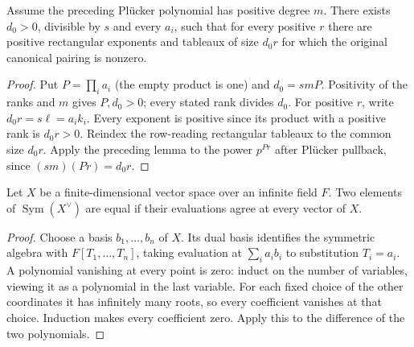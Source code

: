 \begin{lemma}
\label{lem:plucker-invariant-nonzero-sequence}
\leanok
Assume the preceding Pl\"ucker polynomial has positive degree $m$.
There exists $d_0>0$, divisible by $s$ and every $a_i$, such that for
every positive $r$ there are positive rectangular exponents and tableaux
of size $d_0r$ for which the original canonical pairing is nonzero.
\end{lemma}
\begin{proof}
Put $P=\prod_i a_i$ (the empty product is one) and $d_0=smP$.
Positivity of the ranks and $m$ gives $P,d_0>0$; every stated rank
divides $d_0$. For positive $r$, write $d_0r=s\ell=a_i k_i$.
Every exponent is positive since its product with a positive rank is
$d_0r>0$. Reindex the row-reading rectangular tableaux to the common
size $d_0r$. Apply the preceding lemma to the power $p^{Pr}$ after
Pl\"ucker pullback, since $(sm)(Pr)=d_0r$.
\end{proof}

\begin{lemma}
\label{lem:intrinsic-polynomial-ext}
\leanok
Let $X$ be a finite-dimensional vector space over an infinite field $F$.
Two elements of $\operatorname{Sym}(X^\vee)$ are equal if their evaluations
agree at every vector of $X$.
\end{lemma}
\begin{proof}
Choose a basis $b_1,\ldots,b_n$ of $X$. Its dual basis identifies the
symmetric algebra with $F[T_1,\ldots,T_n]$, taking evaluation at
$\sum_i a_i b_i$ to substitution $T_i=a_i$. A polynomial vanishing at
every point is zero: induct on the number of variables, viewing it as a
polynomial in the last variable. For each fixed choice of the other
coordinates it has infinitely many roots, so every coefficient vanishes
at that choice. Induction makes every coefficient zero. Apply this to
the difference of the two polynomials.
\end{proof}

